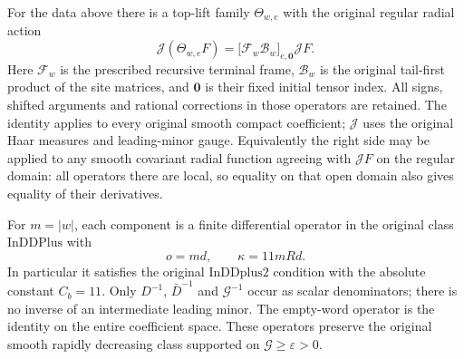 \begin{theorem}\label{actual-top-lift-theorem}
For the data above there is a top-lift family $\Theta_{w,e}$ with
the original regular radial action
\begin{equation}\label{actual-top-lift-radial}
 \mathcal J(\Theta_{w,e}F)
   =\bigl[\mathcal F_w\mathcal B_w\bigr]_{e,\mathbf0}
                                                     \mathcal JF.
\end{equation}
Here $\mathcal F_w$ is the prescribed recursive terminal frame,
$\mathcal B_w$ is the original tail-first product of the site
matrices, and $\mathbf0$ is their fixed initial tensor index.
All signs, shifted arguments and rational corrections in those
operators are retained.  The identity applies to every original
smooth compact coefficient; $\mathcal J$ uses the original Haar
measures and leading-minor gauge.
Equivalently the right side may be applied to any smooth covariant
radial function agreeing with $\mathcal JF$ on the regular domain:
all operators there are local, so equality on that open domain
also gives equality of their derivatives.

For $m=|w|$, each component is a finite differential operator in
the original class $\mathrm{InDDPlus}$ with
\begin{equation}\label{actual-top-lift-cost}
                 o=md,\qquad \kappa=11mRd.
\end{equation}
In particular it satisfies the original $\mathrm{InDDplus2}$
condition with the absolute constant $C_b=11$.  Only $D^{-1}$,
$\bar D^{-1}$ and $\mathcal G^{-1}$ occur as scalar denominators;
there is no inverse of an intermediate leading minor.
The empty-word operator is the identity on the entire coefficient
space.  These operators preserve the original smooth rapidly
decreasing class supported on $\mathcal G\ge\varepsilon>0$.
\end{theorem}

